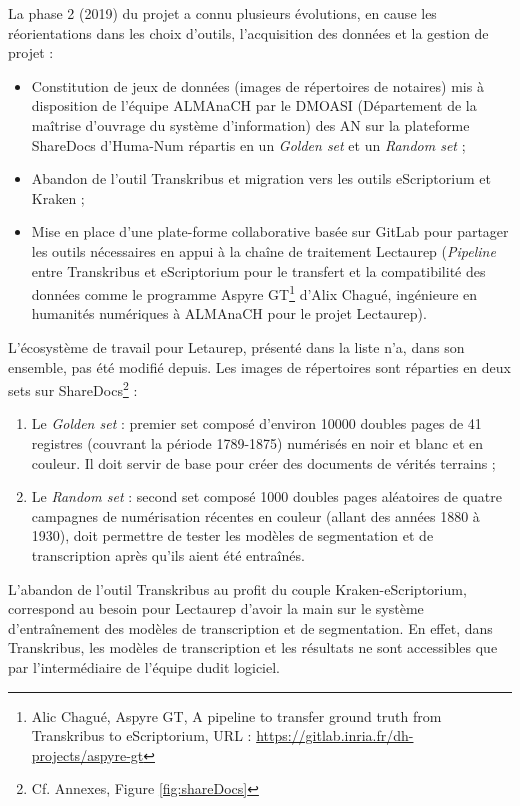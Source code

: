 La phase 2 (2019) du projet a connu plusieurs évolutions, en cause les réorientations dans les choix d'outils, l'acquisition des données et la gestion de projet :
\begin{itemize}
    \item Constitution de jeux de données (images de répertoires de notaires) mis à disposition de l'équipe ALMAnaCH par le DMOASI (Département de la maîtrise d’ouvrage du système d’information) des AN sur la plateforme ShareDocs d'Huma-Num répartis en un \textit{Golden set} et un \textit{Random set} ;
    \item Abandon de l'outil Transkribus et migration vers les outils eScriptorium et Kraken ;
    \item Mise en place d'une plate-forme collaborative basée sur GitLab pour partager les outils nécessaires en appui à la chaîne de traitement Lectaurep (\textit{Pipeline} entre Transkribus et eScriptorium pour le transfert et la compatibilité des données comme le programme Aspyre GT\footnote{Alic Chagué, Aspyre GT, A pipeline to transfer ground truth from Transkribus to eScriptorium, URL : \url{https://gitlab.inria.fr/dh-projects/aspyre-gt}} d'Alix Chagué, ingénieure en humanités numériques à ALMAnaCH pour le projet Lectaurep).
\end{itemize}
\bigskip
L'écosystème de travail pour Letaurep, présenté dans la liste n'a, dans son ensemble, pas été modifié depuis. Les images de répertoires sont réparties en deux sets sur ShareDocs\footnote{Cf. Annexes, Figure \ref{fig:shareDocs}} :
\begin{enumerate}
    \item Le \textit{Golden set} :  premier set composé d'environ 10000 doubles pages de 41 registres (couvrant la période 1789-1875) numérisés en noir et blanc et en couleur. Il doit servir de base pour créer des documents de vérités terrains ;
    \item Le \textit{Random set} : second set composé 1000 doubles pages aléatoires de quatre campagnes de numérisation récentes en couleur (allant des années 1880 à 1930), doit permettre de tester les modèles de segmentation et de transcription après qu'ils aient été entraînés.
\end{enumerate}
\bigskip
L'abandon de l'outil Transkribus au profit du couple Kraken-eScriptorium, correspond au besoin pour Lectaurep d'avoir la main sur le système d'entraînement des modèles de transcription et de segmentation. En effet, dans Transkribus, les modèles de transcription et les résultats ne sont accessibles que par l’intermédiaire de l'équipe dudit logiciel.
